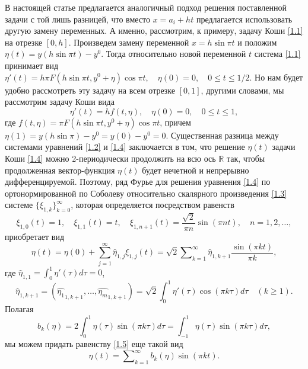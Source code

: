 \documentclass{article}
\numberwithin{equation}{section}
\theoremstyle{plain}
\theoremstyle{definition}
\begin{document}
\begin{fulltext}
  В настоящей статье предлагается аналогичный подход решения поставленной задачи с той лишь разницей, что вместо  $x=a_i+ht$ предлагается использовать другую замену переменных. А именно, рассмотрим, к примеру, задачу Коши \eqref{1.1} на отрезке $[0,h]$.  Произведем замену переменной $x=h\sin\pi t$ и положим $\eta(t)=y(h\sin\pi t)-y^0$. Тогда относительно новой переменной $t$ система \eqref{1.1} принимает вид $\eta'(t)=h\pi F(h\sin \pi t, y^0+\eta)\cos\pi t, \quad \eta(0)=0,\quad 0\le t\le1/2$. Но нам будет удобно рассмотреть эту задачу на всем отрезке $[0,1]$, другими словами, мы рассмотрим задачу Коши вида
\begin{equation}\label{1.4}
\eta'(t)=hf(t,\eta), \quad \eta(0)=0,\quad 0\le t\le1,
\end{equation}
где $f(t,\eta)=\pi F(h\sin \pi t, y^0+\eta)\cos\pi t$, причем $\eta(1)=y(h\sin\pi)-y^0=y(0)-y^0=0$.  Существенная разница между  системами уравнений \eqref{1.2} и \eqref{1.4} заключается в том, что решение $\eta(t)$ задачи Коши \eqref{1.4} можно   2-периодически продолжить на всю ось $\mathbb{R}$ так, чтобы продолженная вектор-функция $\eta(t)$ будет нечетной и непрерывно дифференцируемой.
Поэтому, ряд Фурье для решения уравнения \eqref{1.4} по ортонормированной  по Соболеву относительно скалярного произведения   \eqref{1.3} системе $\{\xi_{1,k}\}_{k=0}^\infty$, которая определяется \cite{SharDagElec7,SharMagDagElec8} посредством равенств
\begin{equation*}
 \xi_{1,0}(t)=1,\quad \xi_{1,1}(t)=t,\quad \xi_{1,n+1}(t)=\frac{\sqrt{2}}{\pi n}\sin(\pi nt),\quad n=1,2,\ldots,
\end{equation*}
 приобретает вид
\begin{equation}\label{1.5}
 \eta(t)=\eta(0)+\sum_{j=1}^\infty \hat\eta_{1,j}\xi_{1,j}(t)=\sqrt{2} \sum\nolimits_{k=1}^\infty \hat \eta_{1,k+1}\frac{\sin(\pi kt)}{\pi k},
 \end{equation}
где $\hat \eta_{1,1}=\int_0^1\eta'(\tau)d\tau=0$,
  \begin{equation}\label{1.6}
\hat \eta_{1,k+1}=(\widehat{\eta_1}_{1,k+1},
\ldots,\widehat{\eta_m}_{1,k+1})=\sqrt{2}\int_{0}^1 \eta'(\tau)\cos(\pi k\tau)d\tau\quad(k\ge1).
\end{equation}
Полагая
\begin{equation*}
b_k(\eta)=2\int_{0}^1 \eta(\tau)\sin(\pi k\tau)d\tau=\int_{-1}^1 \eta(\tau)\sin(\pi k\tau)d\tau,
\end{equation*}
мы можем придать равенству \eqref{1.5}  еще такой вид
\begin{equation*}
 \eta(t)=\sum\nolimits_{k=1}^\infty b_k(\eta)\sin(\pi kt).

\end{equation*}
\end{fulltext}
\end{document}
